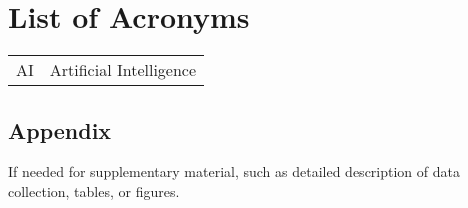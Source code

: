 \documentclass{xai-thesis}
\begin{document}
\section*{List of Acronyms}
\begin{tabular}{@{}ll}
AI & Artificial Intelligence\\
\end{tabular}

%


\cleardoublepage
\pagestyle{headings}
\setcounter{page}{1}
















\clearpage
\begin{appendix}
	\section{Appendix}
	If needed for supplementary material, such as detailed description of data collection, tables, or figures.
	
\end{appendix}

\clearpage
\renewcommand\refname{Bibliography}



\clearpage
\makeThesisDeclaration
\end{document}
